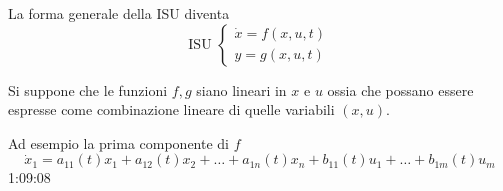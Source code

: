 La forma generale della ISU diventa
\begin{equation}\text{ISU }\left\{
\begin{aligned}
\dot{x} = f(x,u,t)\\
y = g(x,u,t)
\end{aligned}\right.
\label{eq.:ISU_compatta}
\end{equation}

Si suppone che le funzioni $f,g$ siano lineari in $x$ e $u$ ossia che possano essere espresse come
combinazione lineare di quelle variabili $(x,u)$.

Ad esempio la prima componente di $f$
$$
\dot{x}_1 = a_{11}(t)x_1+a_{12}(t)x_2 + \dots + a_{1n}(t)x_n + b_{11}(t)u_1+\dots+b_{1m}(t)u_m
$$
1:09:08
